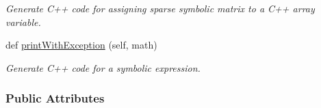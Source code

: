 \begin{DoxyCompactItemize}
\begin{DoxyCompactList}\small\item\em Generate C++ code for assigning sparse symbolic matrix to a C++ array {\ttfamily variable}. \end{DoxyCompactList}\item 
def \mbox{\hyperlink{classamici_1_1sbml__import_1_1_sbml_importer_a8628c4bc7d378583201bf3681bcd0559}{print\+With\+Exception}} (self, math)
\begin{DoxyCompactList}\small\item\em Generate C++ code for a symbolic expression. \end{DoxyCompactList}\end{DoxyCompactItemize}
\subsubsection*{Public Attributes}
